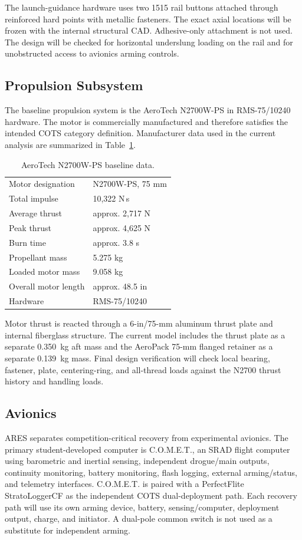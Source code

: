 \documentclass[10pt]{article}
\newcommand{\COMET}{C.O.M.E.T.}
\begin{document}
The launch-guidance hardware uses two 1515 rail buttons attached through reinforced hard points with metallic fasteners. The exact axial locations will be frozen with the internal structural CAD. Adhesive-only attachment is not used. The design will be checked for horizontal underslung loading on the rail and for unobstructed access to avionics arming controls.

\subsection{Propulsion Subsystem}
The baseline propulsion system is the AeroTech N2700W-PS in RMS-75/10240 hardware. The motor is commercially manufactured and therefore satisfies the intended COTS category definition. Manufacturer data used in the current analysis are summarized in Table~\ref{tab:motor}.

\begin{table}[ht]
\centering
\caption{AeroTech N2700W-PS baseline data.}
\label{tab:motor}
\begin{tabular}{@{}ll@{}}
\toprule
Motor designation & N2700W-PS, 75 mm \\
Total impulse & 10,322 N\,s \\
Average thrust & approx. 2,717 N \\
Peak thrust & approx. 4,625 N \\
Burn time & approx. 3.8 s \\
Propellant mass & 5.275 kg \\
Loaded motor mass & 9.058 kg \\
Overall motor length & approx. 48.5 in \\
Hardware & RMS-75/10240 \\
\bottomrule
\end{tabular}
\end{table}

Motor thrust is reacted through a 6-in/75-mm aluminum thrust plate and internal fiberglass structure. The current model includes the thrust plate as a separate \SI{0.350}{kg} aft mass and the AeroPack 75-mm flanged retainer as a separate \SI{0.139}{kg} mass. Final design verification will check local bearing, fastener, plate, centering-ring, and all-thread loads against the N2700 thrust history and handling loads.

\subsection{Avionics}
ARES separates competition-critical recovery from experimental avionics. The primary student-developed computer is \COMET{}, an SRAD flight computer using barometric and inertial sensing, independent drogue/main outputs, continuity monitoring, battery monitoring, flash logging, external arming/status, and telemetry interfaces. \COMET{} is paired with a PerfectFlite StratoLoggerCF as the independent COTS dual-deployment path. Each recovery path will use its own arming device, battery, sensing/computer, deployment output, charge, and initiator. A dual-pole common switch is not used as a substitute for independent arming.
\end{document}
